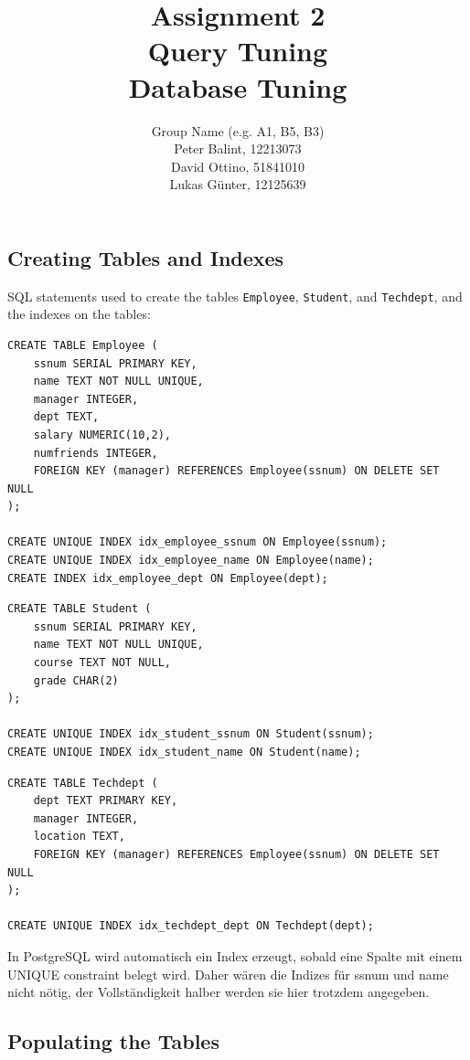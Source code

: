 \documentclass[11pt]{scrartcl}
\title{
  \textbf{\large Assignment 2} \\
  Query Tuning \\
  {\large Database Tuning}
}
\author{
  Group Name (e.g. A1, B5, B3) \\
  \large Peter Balint, 12213073 \\
  \large David Ottino, 51841010 \\
  \large Lukas Günter, 12125639
}
\begin{document}
\maketitle\thispagestyle{empty}

\subsection*{Creating Tables and Indexes}

SQL statements used to create the tables \texttt{Employee}, \texttt{Student}, and \texttt{Techdept}, and the indexes on the tables:

\begin{lstlisting}[style=dbtsql]
CREATE TABLE Employee (
    ssnum SERIAL PRIMARY KEY,
    name TEXT NOT NULL UNIQUE,
    manager INTEGER,
    dept TEXT,
    salary NUMERIC(10,2),
    numfriends INTEGER,
    FOREIGN KEY (manager) REFERENCES Employee(ssnum) ON DELETE SET NULL
);

CREATE UNIQUE INDEX idx_employee_ssnum ON Employee(ssnum);
CREATE UNIQUE INDEX idx_employee_name ON Employee(name);
CREATE INDEX idx_employee_dept ON Employee(dept);
\end{lstlisting}

\begin{lstlisting}[style=dbtsql]
CREATE TABLE Student (
    ssnum SERIAL PRIMARY KEY,
    name TEXT NOT NULL UNIQUE,
    course TEXT NOT NULL,
    grade CHAR(2)
);

CREATE UNIQUE INDEX idx_student_ssnum ON Student(ssnum);
CREATE UNIQUE INDEX idx_student_name ON Student(name);
\end{lstlisting}

\begin{lstlisting}[style=dbtsql]
CREATE TABLE Techdept (
    dept TEXT PRIMARY KEY,
    manager INTEGER,
    location TEXT,
    FOREIGN KEY (manager) REFERENCES Employee(ssnum) ON DELETE SET NULL
);

CREATE UNIQUE INDEX idx_techdept_dept ON Techdept(dept);
\end{lstlisting}

In PostgreSQL wird automatisch ein Index erzeugt, sobald eine Spalte mit einem
UNIQUE constraint belegt wird. Daher wären die Indizes für ssnum und name nicht nötig,
der Vollständigkeit halber werden sie hier trotzdem angegeben.


\subsection*{Populating the Tables}
\end{document}
